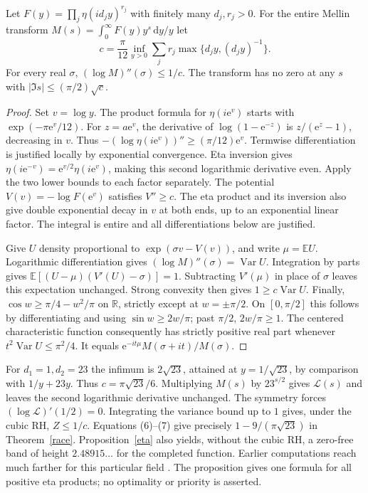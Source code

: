 \documentclass[11pt]{article}
\newcommand{\RR}{\mathbb R}
\newcommand{\e}{\mathrm e}
\newcommand{\dd}{\,\mathrm d}
\newcommand{\Li}{\mathcal L}
\begin{document}
\begin{proposition}\label{eta}
Let $F(y)=\prod_j\eta(i d_j y)^{r_j}$ with finitely many $d_j,r_j>0$. For the entire Mellin transform $M(s)=\int_0^\infty F(y)y^s\dd y/y$ let
\[
 c=\frac{\pi}{12}\inf_{y>0}\sum_j r_j\max\{d_j y,(d_j y)^{-1}\}.
\]
For every real $\sigma$, $(\log M)''(\sigma)\le1/c$. The transform has no zero at any $s$ with $|\Im s|\le(\pi/2)\sqrt c$.
\end{proposition}
\begin{proof}
Set $v=\log y$. The product formula for $\eta(i\e^v)$ starts with $\exp(-\pi\e^v/12)$. For $z=a\e^v$, the derivative of $\log(1-\e^{-z})$ is $z/(\e^z-1)$, decreasing in $v$. Thus $-(\log\eta(i\e^v))''\ge(\pi/12)\e^v$. Termwise differentiation is justified locally by exponential convergence. Eta inversion gives $\eta(i\e^{-v})=\e^{v/2}\eta(i\e^v)$, making this second logarithmic derivative even. Apply the two lower bounds to each factor separately. The potential $V(v)=-\log F(\e^v)$ satisfies $V''\ge c$. The eta product and its inversion also give double exponential decay in $v$ at both ends, up to an exponential linear factor. The integral is entire and all differentiations below are justified.

Give $U$ density proportional to $\exp(\sigma v-V(v))$, and write $\mu=\mathbb E U$. Logarithmic differentiation gives $(\log M)''(\sigma)=\operatorname{Var}U$. Integration by parts gives $\mathbb E[(U-\mu)(V'(U)-\sigma)]=1$. Subtracting $V'(\mu)$ in place of $\sigma$ leaves this expectation unchanged. Strong convexity then gives $1\ge c\operatorname{Var}U$. Finally, $\cos w\ge\pi/4-w^2/\pi$ on $\RR$, strictly except at $w=\pm\pi/2$. On $[0,\pi/2]$ this follows by differentiating and using $\sin w\ge2w/\pi$; past $\pi/2$, $2w/\pi\ge1$. The centered characteristic function consequently has strictly positive real part whenever $t^2\operatorname{Var}U\le\pi^2/4$. It equals $\e^{-it\mu}M(\sigma+it)/M(\sigma)$.
\end{proof}

For $d_1=1,d_2=23$ the infimum is $2\sqrt{23}$, attained at $y=1/\sqrt{23}$, by comparison with $1/y+23y$. Thus $c=\pi\sqrt{23}/6$. Multiplying $M(s)$ by $23^{s/2}$ gives $\Li(s)$ and leaves the second logarithmic derivative unchanged. The symmetry forces $(\log\Li)'(1/2)=0$. Integrating the variance bound up to $1$ gives, under the cubic RH, $Z\le1/c$. Equations (6)--(7) give precisely $1-9/(\pi\sqrt{23})$ in Theorem~\ref{race}. Proposition~\ref{eta} also yields, without the cubic RH, a zero-free band of height $2.48915\ldots$ for the completed function. Earlier computations reach much farther for this particular field \cite{ng}. The proposition gives one formula for all positive eta products; no optimality or priority is asserted.
\end{document}
